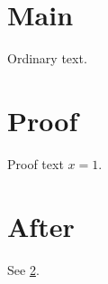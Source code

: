 \documentclass{article}
\makeatletter
\renewenvironment{appendices}{%
  \@resets@pp
  \if@dotoc@pp
    \if@chapter@pp\clear@ppage\fi
    \addappheadtotoc
  \fi
  \if@dotitle@pp\def\sectionname{\appendixname}\fi
}{\@ppsaveapp\@pprestoresec}
\makeatother
\begin{document}
\section{Main}Ordinary text.
\begin{appendices}
\section{Proof}\label{app:proof}Proof text $x=1$.
\end{appendices}
\section{After}See \ref{app:proof}.
\end{document}
